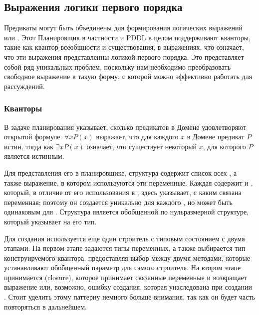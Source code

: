 \subsection{Выражения логики первого порядка}

Предикаты могут быть объединены для формирования логических выражений или .
Этот Планировщик в частности и PDDL в целом поддерживают кванторы, такие как
квантор всеобщности и существования, в выражениях,
что означает, что эти выражения представленны логикой первого порядка.
Это представляет собой ряд уникальных проблем,
поскольку нам необходимо преобразовать свободное выражение
в такую форму, с которой можно эффективно работать для рассуждений.

\subsubsection{Кванторы}

В задаче планирования  указывает,
сколько предикатов в Домене удовлетворяют открытой формуле.
 $\forall x P(x)$ выражает,
что для каждого $x$ в Домене предикат $P$ истин,
тогда как  $\exists x P(x)$ означает,
что существует некоторый $x$, для которого $P$ является истинным.

Для представления его в планировщике,
структура  содержит список всех ,
а также выражение, в котором используются эти переменные.
Каждая  содержит  и ,
который, в отличие от его использования в ,
здесь указывает, с каким  связана переменная;
поэтому он создается уникально для каждого ,
но может быть одинаковым для .
Структура  является обобщенной по нульразмерной структуре,
который указывает на его тип.

Для создания  используется еще один строитель с типовым состоянием с двумя этапами.
На первом этапе задаются типы переменных,
а также выбирается тип конструируемого квантора,
предоставляя выбор между двумя методами,
которые устанавливают обобщенный параметр для самого строителя.
На втором этапе принимается  (closure), которое принимает связанные переменные
и возвращает выражение или, возможно, ошибку создания, которая унаследована при создании .
Стоит уделить этому паттерну немного больше внимания, так как он будет часть повторяться в дальнейшем.

